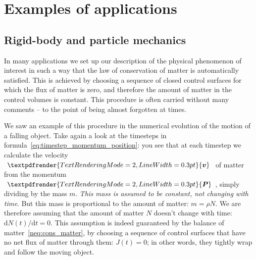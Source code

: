 \documentclass[a4paper,12pt,%
onecolumn,oneside,titlepage,%
british%
]{memoir}
\renewcommand*{\bm}[1]{\textpdfrender{TextRenderingMode=2,LineWidth=0.3pt}{\boldsymbol{#1}}}
\newcommand*{\di}{\mathrm{d}}%
\renewcommand*{\|}[1][]{\nonscript\:#1\vert\nonscript\:\mathopen{}}
\newcommand*{\yv}{\bm{v}}
\newcommand*{\yN}{N}
\newcommand*{\yJ}{J}
\newcommand*{\yrho}{\rho}
\newcommand*{\yM}{m}%
\newcommand*{\yP}{\bm{P}}
\begin{document}
\section{Examples of applications}
\label{nsec:matter_applic}

\subsection{Rigid-body and particle mechanics}
\label{nsec:cons_matter_particle}

In many applications we set up our description of the physical phenomenon of interest in such a way that the law of conservation of matter is automatically satisfied. This is achieved by choosing a sequence of closed control surfaces for which the flux of matter is zero, and therefore the amount of matter in the control volumes is constant. This procedure is often carried without many comments -- to the point of being almost forgotten at times.

We saw an example of this procedure in the {numerical evolution of the motion of a falling object}.
%
Take again a look at the timesteps in formula~\eqref{eq:timestep_momentum_position}: you see that at each timestep we calculate the velocity $\yv$ of matter from the momentum $\yP$, simply dividing by the mass $\yM$. \emph{This mass is assumed to be constant, not changing with time}. But this mass is proportional to the amount of matter: $\yM = \yrho \yN$. We are therefore assuming that the amount of matter $\yN$ doesn't change with time: $\di\yN(t)/\di t = 0$. This assumption is indeed guaranteed by the balance of matter~\eqref{neq:cons_matter}, by choosing a sequence of control surfaces that have no net flux of matter through them: $\yJ(t)=0$; in other words, they tightly wrap and follow the moving object.
\end{document}
